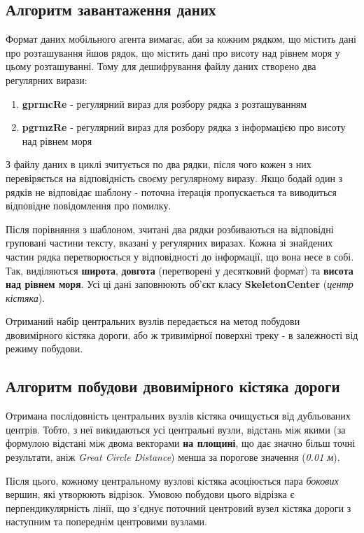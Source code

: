 \documentclass[simple,a4paper,14pt,ukrainian,utf8]{eskdtext}
\begin{document}
	\subsection{Алгоритм завантаження даних}
	
	Формат даних мобільного агента вимагає, аби за кожним рядком, що містить дані про розташування йшов рядок, що містить дані про висоту над рівнем моря у цьому розташуванні. Тому для дешифрування файлу даних створено два регулярних вирази:
	
	\begin{enumerate}
		\item \textbf{gprmcRe} - регулярний вираз для розбору рядка з розташуванням
		\item \textbf{pgrmzRe} - регулярний вираз для розбору рядка з інформацією про висоту над рівнем моря
	\end{enumerate}
	
	З файлу даних в циклі зчитується по два рядки, після чого кожен з них перевіряється на відповідність своєму регулярному виразу. Якщо бодай один з рядків не відповідає шаблону - поточна ітерація пропускається та виводиться відповідне повідомлення про помилку.
	
	Після порівняння з шаблоном, зчитані два рядки розбиваються на відповідні груповані частини тексту, вказані у регулярних виразах. Кожна зі знайдених частин рядка перетворюється у відповідності до інформації, що вона несе в собі. Так, виділяються \textbf{широта}, \textbf{довгота} (перетворені у десятковий формат) та \textbf{висота над рівнем моря}. Усі ці дані заповнюють об’єкт класу \textbf{SkeletonCenter} (\textit{центр кістяка}).
	
	Отриманий набір центральних вузлів передається на метод побудови двовимірного кістяка дороги, або ж тривимірної поверхні треку - в залежності від режиму побудови.
	
	\subsection{Алгоритм побудови двовимірного кістяка дороги}
	
		Отримана послідовність центральних вузлів кістяка очищується від дубльованих центрів. Тобто, з неї викидаються усі центральні вузли, відстань між якими (за формулою відстані між двома векторами \textbf{на площині}, що дає значно більш точні результати, аніж \textit{Great Circle Distance}) менша за порогове значення (\textit{0.01 м}).
		
		Після цього, кожному центральному вузлові кістяка асоціюється пара \textit{бокових} вершин, які утворюють відрізок. Умовою побудови цього відрізка є перпендикулярність лінії, що з’єднує поточний центровий вузел кістяка дороги з наступним та попереднім центровими вузлами. 
		
\end{document}
